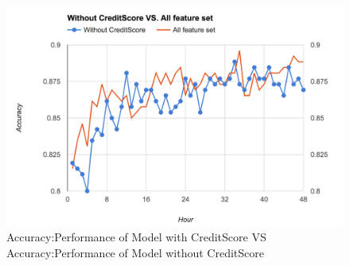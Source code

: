  \begin{figure}[!h]
\centering
\includegraphics[width=\columnwidth]{images/WCVSAF.png}
\caption{Accuracy:Performance of Model with CreditScore VS Accuracy:Performance of Model without CreditScore}
\label{fig:WCVSAF}
\end{figure}

  \begin{table}[!h]
 \centering
{}
\caption{Ranks of CreditScore}
\label{tab:Rank_Credit}
\end{table}
  
  \begin{table}[!h]
\centering
{}
 \caption{Rank of Part of CreditScore and CrowdWisdom}
\label{SPikemfeaturerank2}

 \end{table}
 

